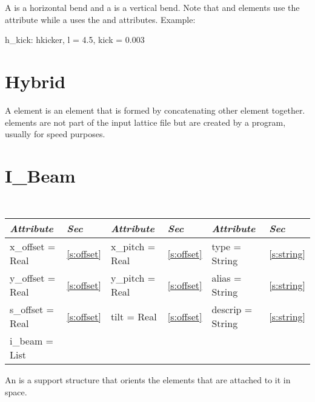 A  is a horizontal bend and a  is a vertical
bend.  Note that  and  elements use the
 attribute while a  uses the  and  
attributes. Example:
\begin{example}
  h_kick: hkicker, l = 4.5, kick = 0.003
\end{example}

\section{Hybrid}
\label{s:hybrid}

A  element is an element that is formed by concatenating
other element together.  elements are not part of the input
lattice file but are created by a program, usually for speed purposes.

\section{I\_Beam}
\label{s:i_beam}

\begin{center}
\tt
\begin{tabular}{|l|l||l|l||l|l|} \hline
  {\sl Attribute} & {\sl Sec}  & {\sl Attribute} & {\sl Sec} & {\sl Attribute} & {\sl Sec} \\ \hline
  x\_offset  = Real     & \ref{s:offset}  &   x\_pitch  = Real     & \ref{s:offset}  &  type = String    & \ref{s:string}  \\ \hline
  y\_offset  = Real     & \ref{s:offset}  &   y\_pitch  = Real     & \ref{s:offset}  &  alias = String   & \ref{s:string}  \\ \hline
  s\_offset  = Real     & \ref{s:offset}  &   tilt      = Real     & \ref{s:offset}  &  descrip = String & \ref{s:string}  \\ \hline
  i\_beam = List        &                 &                        &                 &                   &                 \\ \hline
\end{tabular}
\end{center}
\toffset

An  is a support structure that orients the elements that
are attached to it in space.

